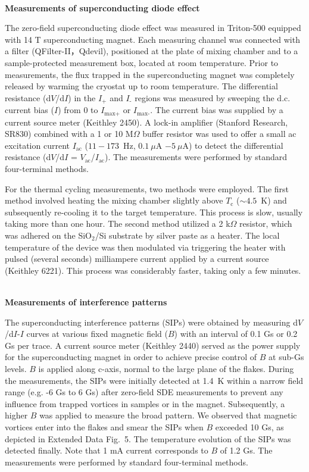 \documentclass[article,reprint,amsmath,amssymb,superscriptaddress,longbibliography]{revtex4-1}
\begin{document}
~\\
\textbf{Measurements of superconducting diode effect}

\noindent
The zero-field superconducting diode effect was measured in Triton-500 equipped with 14 T superconducting magnet. Each measuring channel was connected with a filter (QFilter-II，Qdevil), positioned at the plate of mixing chamber and to a sample-protected  measurement box, located at room temperature.  Prior to measurements, the flux trapped in the superconducting magnet was completely released by warming the cryostat up to room temperature.  The differential resistance (d$V$/d$I$) in the $I_\textrm{+}$ and $I_\textrm{-}$ regions was measured by sweeping the d.c. current bias ($I$) from 0 to $I_\textrm{max+}$ or $I_\textrm{max-}$. The current bias was supplied by a current source meter (Keithley 2450). A lock-in amplifier (Stanford Research, SR830) combined with a 1 or 10 M$\Omega$ buffer resistor was used to offer a small ac excitation current $I_{\textrm{ac}}$ ($11-173$~Hz, $0.1~\mu$A $-5~\mu$A) to detect the differential resistance (d$V$/d$I$ = $V_\textrm{ac}$/$I_\textrm{ac}$). The measurements were performed by standard four-terminal methods. 

For the thermal cycling measurements, two methods were employed. The first method involved heating the mixing chamber slightly above $T_\textrm{c}$ ($\sim4.5$~K) and subsequently re-cooling it to the target temperature. This process is slow, usually taking more than one hour.  The second method utilized a 2 k$\Omega$ resistor, which was adhered on the SiO$_2$/Si substrate by silver paste as a heater. The local temperature of the device was then modulated via triggering the heater with pulsed (several seconds) milliampere current applied by a current source (Keithley 6221). This process was considerably faster, taking only a few minutes. 

~\\
\noindent\textbf{Measurements of interference patterns}

\noindent
The superconducting interference patterns (SIPs) were obtained by measuring d$V$/d$I$-$I$ curves at various fixed magnetic field ($B$) with an interval of 0.1 Gs or 0.2 Gs per trace. A current source meter (Keithley 2440) served as the power supply for the superconducting magnet in order to achieve precise control of $B$ at sub-Gs levels. $B$ is applied along c-axis, normal to the large plane of the flakes. During the measurements, the SIPs were initially detected at 1.4~K within a narrow field range (e.g. -6 Gs to 6 Gs) after zero-field SDE measurements to prevent any influence from trapped vortices in samples or in the magnet. Subsequently, a higher $B$ was applied to measure the broad pattern. We observed that magnetic vortices enter into the flakes and smear the SIPs when $B$ exceeded 10 Gs, as depicted in Extended Data Fig.~5. The temperature evolution of the SIPs was detected finally. Note that 1 mA current corresponds to $B$ of 1.2 Gs. The measurements were performed by standard four-terminal methods. 
\end{document}
